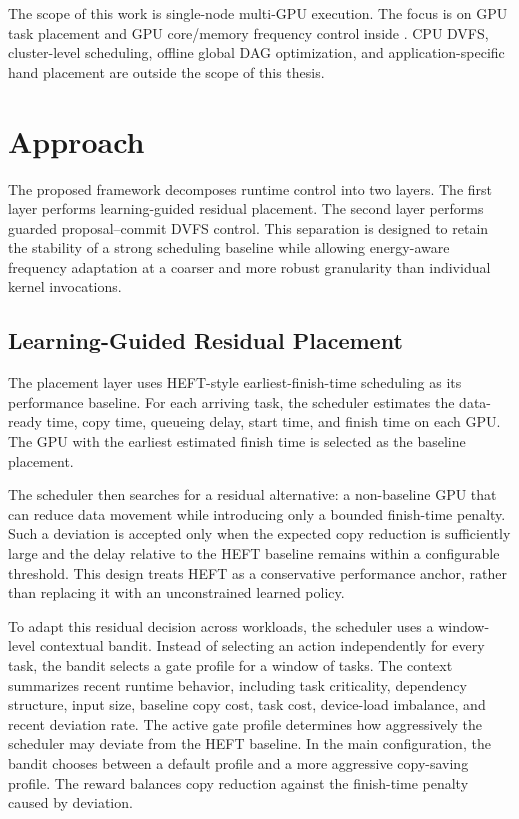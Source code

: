 The scope of this work is single-node multi-GPU execution. The focus is on GPU task placement and GPU core/memory frequency control inside \CUDASTF{}. CPU DVFS, cluster-level scheduling, offline global DAG optimization, and application-specific hand placement are outside the scope of this thesis.

\section{Approach}

The proposed framework decomposes runtime control into two layers. The first layer performs learning-guided residual placement. The second layer performs guarded proposal--commit DVFS control. This separation is designed to retain the stability of a strong scheduling baseline while allowing energy-aware frequency adaptation at a coarser and more robust granularity than individual kernel invocations.

\subsection{Learning-Guided Residual Placement}

The placement layer uses HEFT-style earliest-finish-time scheduling as its performance baseline. For each arriving task, the scheduler estimates the data-ready time, copy time, queueing delay, start time, and finish time on each GPU. The GPU with the earliest estimated finish time is selected as the baseline placement.

The scheduler then searches for a residual alternative: a non-baseline GPU that can reduce data movement while introducing only a bounded finish-time penalty. Such a deviation is accepted only when the expected copy reduction is sufficiently large and the delay relative to the HEFT baseline remains within a configurable threshold. This design treats HEFT as a conservative performance anchor, rather than replacing it with an unconstrained learned policy.

To adapt this residual decision across workloads, the scheduler uses a window-level contextual bandit. Instead of selecting an action independently for every task, the bandit selects a gate profile for a window of tasks. The context summarizes recent runtime behavior, including task criticality, dependency structure, input size, baseline copy cost, task cost, device-load imbalance, and recent deviation rate. The active gate profile determines how aggressively the scheduler may deviate from the HEFT baseline. In the main configuration, the bandit chooses between a default profile and a more aggressive copy-saving profile. The reward balances copy reduction against the finish-time penalty caused by deviation.

